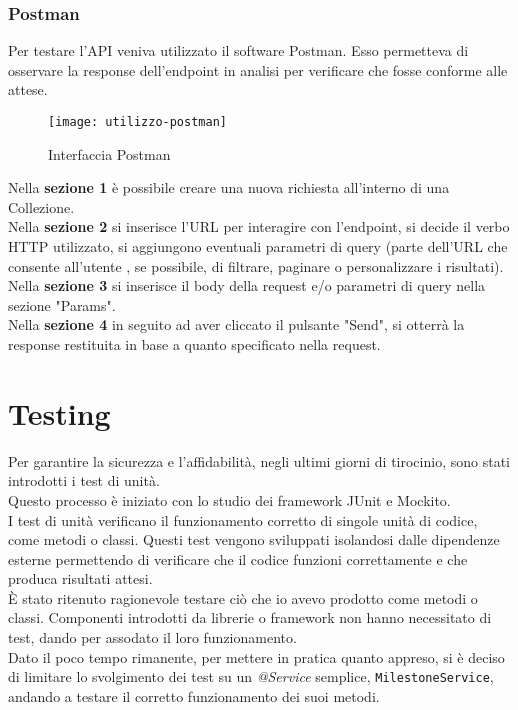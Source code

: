 \subsubsection{Postman}
Per testare l'API veniva utilizzato il software Postman. Esso permetteva di osservare la response dell'endpoint in analisi per verificare che fosse conforme alle attese.\\

\begin{figure}[H] 
    \centering 
    \texttt{[image: utilizzo-postman]} 
    \caption{Interfaccia Postman}
\end{figure}

\noindent Nella \textbf{sezione 1} è possibile creare una nuova richiesta all'interno di una Collezione.\\
Nella \textbf{sezione 2} si inserisce l'URL per interagire con l'endpoint, si decide il verbo HTTP utilizzato, si aggiungono eventuali parametri di query (parte dell'URL che consente all'utente , se possibile, di filtrare, paginare o personalizzare i risultati).\\
Nella \textbf{sezione 3} si inserisce il body della request e/o parametri di query nella sezione "Params".\\
Nella \textbf{sezione 4} in seguito ad aver cliccato il pulsante "Send", si otterrà la response restituita in base a quanto specificato nella request.\\

\section{Testing}
Per garantire la sicurezza e l’affidabilità, negli ultimi giorni di tirocinio, sono stati introdotti i test di unità.\\
Questo processo è iniziato con lo studio dei framework JUnit e Mockito.\\
I test di unità verificano il funzionamento corretto di singole unità di codice, come metodi o classi. Questi test vengono sviluppati isolandosi dalle dipendenze esterne permettendo di verificare che il codice funzioni correttamente e che produca risultati attesi.\\
È stato ritenuto ragionevole testare ciò che io avevo prodotto come metodi o classi. Componenti introdotti da librerie o framework non hanno necessitato di test, dando per assodato il loro funzionamento.\\
Dato il poco tempo rimanente, per mettere in pratica quanto appreso, si è deciso di limitare lo svolgimento dei test su un \textit{@Service} semplice, \texttt{MilestoneService}, andando a testare il corretto funzionamento dei suoi metodi.

